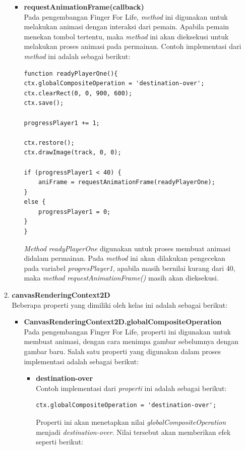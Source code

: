 \begin{enumerate}
\begin{enumerate}
\begin{itemize}
			\item \textbf{requestAnimationFrame(callback)} \\
			Pada pengembangan Finger For Life, \textit{method} ini digunakan untuk melakukan animasi dengan interaksi dari pemain. Apabila pemain menekan tombol tertentu, maka \textit{method} ini akan dieksekusi untuk melakukan proses animasi pada permainan. Contoh implementasi dari \textit{method} ini adalah sebagai berikut:
\begin{lstlisting}[caption={Implementasi \textit{method requestAnimationFrame()}}]
function readyPlayerOne(){
ctx.globalCompositeOperation = 'destination-over';
ctx.clearRect(0, 0, 900, 600);
ctx.save();

progressPlayer1 += 1;

ctx.restore();
ctx.drawImage(track, 0, 0);

if (progressPlayer1 < 40) {
	aniFrame = requestAnimationFrame(readyPlayerOne);
}
else {
	progressPlayer1 = 0;
}
}
\end{lstlisting}
\textit{Method readyPlayerOne} digunakan untuk proses membuat animasi didalam permainan. Pada \textit{method} ini akan dilakukan pengecekan pada variabel \textit{progresPlayer1}, apabila masih bernilai kurang dari 40, maka \textit{method requestAnimationFrame()} masih akan dieksekusi.
		\end{itemize}
		
		\item \textbf{canvasRenderingContext2D} \\
		Beberapa properti yang dimiliki oleh kelas ini adalah sebagai berikut:
		\begin{itemize}
			\item \textbf{CanvasRenderingContext2D.globalCompositeOperation} \\
			Pada pengembangan Finger For Life, properti ini digunakan untuk membuat animasi, dengan cara menimpa gambar sebelumnya dengan gambar baru. Salah satu properti yang digunakan dalam proses implementasi adalah sebagai berikut:
			\begin{itemize}
				\item \textbf{destination-over} \\
				Contoh implementasi dari \textit{properti} ini adalah sebagai berikut:
				
\begin{lstlisting}[caption={Implementasi properti \textit{globalCompositeOperation}}]
ctx.globalCompositeOperation = 'destination-over';
\end{lstlisting}
Properti ini akan menetapkan nilai \textit{globalCompositeOperation} menjadi \textit{destination-over}. Nilai tersebut akan memberikan efek seperti berikut:


\end{itemize}
\end{itemize}
\end{enumerate}
\end{enumerate}
